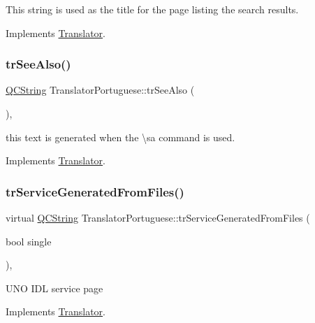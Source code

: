 This string is used as the title for the page listing the search results. 

Implements \mbox{\hyperlink{class_translator}{Translator}}.

\mbox{\label{class_translator_portuguese_ad2a4a2483a58c22915bbe488d072afad}} 
\subsubsection{\texorpdfstring{trSeeAlso()}{trSeeAlso()}}
{\footnotesize\ttfamily \mbox{\hyperlink{class_q_c_string}{Q\+C\+String}} Translator\+Portuguese\+::tr\+See\+Also (\begin{DoxyParamCaption}{ }\end{DoxyParamCaption})\hspace{0.3cm}{\ttfamily [inline]}, {\ttfamily [virtual]}}

this text is generated when the \textbackslash{}sa command is used. 

Implements \mbox{\hyperlink{class_translator}{Translator}}.

\mbox{\label{class_translator_portuguese_a1ebad291afbe1856923b27fe2c7193d4}} 
\subsubsection{\texorpdfstring{trServiceGeneratedFromFiles()}{trServiceGeneratedFromFiles()}}
{\footnotesize\ttfamily virtual \mbox{\hyperlink{class_q_c_string}{Q\+C\+String}} Translator\+Portuguese\+::tr\+Service\+Generated\+From\+Files (\begin{DoxyParamCaption}\item[{bool}]{single }\end{DoxyParamCaption})\hspace{0.3cm}{\ttfamily [inline]}, {\ttfamily [virtual]}}

U\+NO I\+DL service page 

Implements \mbox{\hyperlink{class_translator}{Translator}}.


